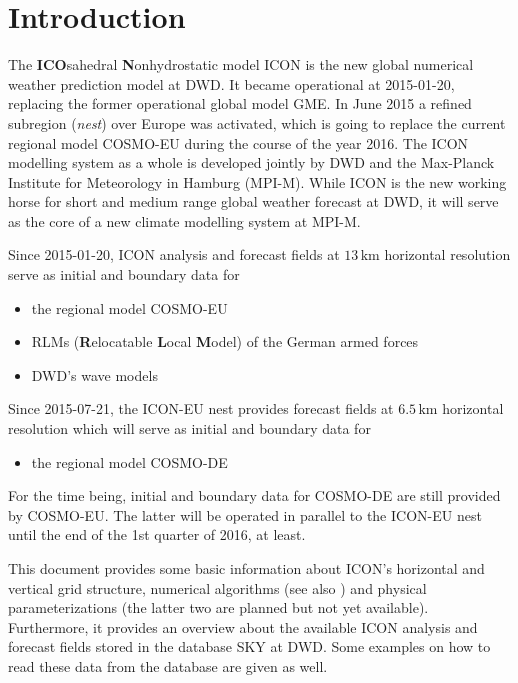 \chapter{Introduction}

The \textbf{ICO}sahedral \textbf{N}onhydrostatic model ICON is the new global numerical 
weather prediction model at DWD. It became operational at 2015-01-20, replacing the former  
operational global model GME. 
In June 2015 a refined subregion (\emph{nest}) over Europe was activated, which is going to 
replace the current regional model COSMO-EU during the course of the year 2016.
The ICON modelling system as a whole is developed jointly by DWD and the Max-Planck Institute 
for Meteorology in Hamburg (MPI-M). While ICON is the new working horse for short and medium range 
global weather forecast at DWD, it will serve as the core of a new climate modelling system at MPI-M.

Since 2015-01-20, ICON analysis and forecast fields at $13\,\mathrm{km}$ horizontal resolution 
serve as initial and boundary data for
\begin{itemize}
 \item the regional model COSMO-EU
 \item RLMs (\textbf{R}elocatable \textbf{L}ocal \textbf{M}odel) of the German armed forces
 \item DWD's wave models
\end{itemize}

Since 2015-07-21, the ICON-EU nest provides forecast fields at $6.5\,\mathrm{km}$ horizontal resolution
which will serve as initial and boundary data for
\begin{itemize}
 \item the regional model COSMO-DE
\end{itemize}
For the time being, initial and boundary data for COSMO-DE are still provided by COSMO-EU. The 
latter will be operated in parallel to the ICON-EU nest until the end of the 1st quarter of 2016, 
at least.

This document provides some basic information about ICON's horizontal and vertical grid structure, 
numerical algorithms (see also \cite{Zaengl15}) and physical parameterizations (the latter two are 
planned but not yet available). Furthermore, it provides an overview about the available ICON analysis 
and forecast fields stored in the database SKY at DWD. Some examples on how to read these data from 
the database are given as well.

